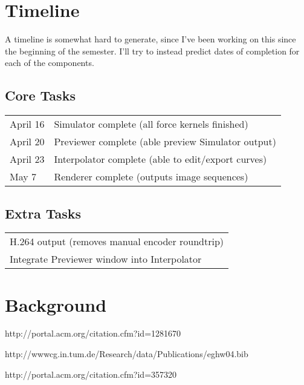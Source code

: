 \documentclass{acmsiggraph}
\begin{document}
\section{Timeline}

A timeline is somewhat hard to generate, since I've been working on this since the beginning of the semester. I'll try to instead predict dates of completion for each of the components.

\subsection{Core Tasks}

\begin{tabular}{ l l }
    April 16 & Simulator complete (all force kernels finished)\\
    April 20 & Previewer complete (able preview Simulator output)\\
    April 23 & Interpolator complete (able to edit/export curves)\\
    May 7 & Renderer complete (outputs image sequences)\\
\end{tabular}

\subsection{Extra Tasks}

\begin{tabular}{ l }
    H.264 output (removes manual encoder roundtrip)\\
    Integrate Previewer window into Interpolator\\
\end{tabular}

\section{Background}

http://portal.acm.org/citation.cfm?id=1281670

http://wwwcg.in.tum.de/Research/data/Publications/eghw04.bib

http://portal.acm.org/citation.cfm?id=357320
\end{document}
